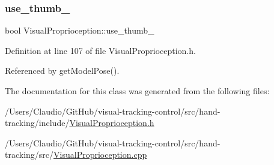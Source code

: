 \subsubsection{\texorpdfstring{use\+\_\+thumb\+\_\+}{use\_thumb\_}}
{\footnotesize\ttfamily bool Visual\+Proprioception\+::use\+\_\+thumb\+\_\+\hspace{0.3cm}{\ttfamily [protected]}}



Definition at line 107 of file Visual\+Proprioception.\+h.



Referenced by get\+Model\+Pose().



The documentation for this class was generated from the following files\+:\begin{DoxyCompactItemize}
\item 
/\+Users/\+Claudio/\+Git\+Hub/visual-\/tracking-\/control/src/hand-\/tracking/include/\hyperlink{VisualProprioception_8h}{Visual\+Proprioception.\+h}\item 
/\+Users/\+Claudio/\+Git\+Hub/visual-\/tracking-\/control/src/hand-\/tracking/src/\hyperlink{VisualProprioception_8cpp}{Visual\+Proprioception.\+cpp}\end{DoxyCompactItemize}
